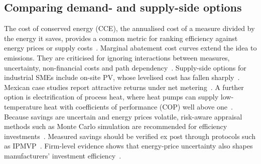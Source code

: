 \documentclass[processes,article,submit,pdftex,moreauthors]{Definitions/mdpi}
\begin{document}
\subsection{Comparing demand- and supply-side options}
The cost of conserved energy (CCE), the annualised cost of a measure divided by the energy it saves, provides a common metric for ranking efficiency against energy prices or supply costs~\cite{meier1982,tesema2015}. Marginal abatement cost curves extend the idea to emissions. They are criticised for ignoring interactions between measures, uncertainty, non-financial costs and path dependency~\cite{kesicki2012,huang2016}. Supply-side options for industrial SMEs include on-site PV, whose levelised cost has fallen sharply~\cite{irena2025costs}. Mexican case studies report attractive returns under net metering~\cite{delfinportela2023,linvill2017}. A further option is electrification of process heat, where heat pumps can supply low-temperature heat with coefficients of performance (COP) well above one~\cite{arpagaus2018,schlosser2020,madeddu2020,iea2022heatpumps}. Because savings are uncertain and energy prices volatile, risk-aware appraisal methods such as Monte Carlo simulation are recommended for efficiency investments~\cite{mills2006,jackson2010}. Measured savings should be verified ex post through protocols such as IPMVP~\cite{evo2022ipmvp}. Firm-level evidence shows that energy-price uncertainty also shapes manufacturers' investment efficiency~\cite{anh2024}.
\end{document}
